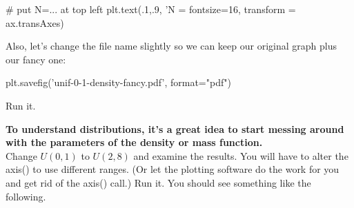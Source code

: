 \begin{fullwidth}
\begin{pyverbatim}
# put N=... at top left
plt.text(.1,.9, 'N = %
		 fontsize=16,
		 transform = ax.transAxes) 
\end{pyverbatim}

\step Also, let's change the file name slightly so we can keep our original graph plus our fancy one:

\begin{pyverbatim}
plt.savefig('unif-0-1-density-fancy.pdf', format="pdf")
\end{pyverbatim}

\step Run it. \\


{\bf To understand distributions, it's a great idea to start messing around with the parameters of the density or mass function.} \\

\step Change $U(0,1)$ to $U(2,8)$ and examine the results. You will have to alter the axis() to use different ranges. (Or let the plotting software do the work for you and get rid of the axis() call.) Run it. You should see something like the following.



\end{fullwidth}
